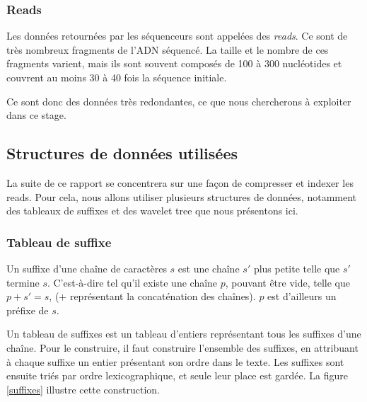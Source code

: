 \subsubsection{Reads}
Les données retournées par les séquenceurs sont appelées des \emph{reads}. Ce sont de très nombreux fragments de l'ADN séquencé. La taille et le nombre de ces fragments varient, mais ils sont souvent composés de 100 à 300 nucléotides et couvrent au moins 30 à 40 fois la séquence initiale. 

Ce sont donc des données très redondantes, ce que nous chercherons à exploiter dans ce stage.


\subsection{Structures de données utilisées}
La suite de ce rapport se concentrera sur une façon de compresser et indexer les reads. Pour cela, nous allons utiliser plusieurs structures de données, notamment des tableaux de suffixes et des wavelet tree que nous présentons ici.

\subsubsection{Tableau de suffixe}
Un suffixe d'une chaîne de caractères $s$ est une chaîne $s'$ plus petite telle que $s'$ termine $s$. C'est-à-dire tel qu'il existe une chaîne $p$, pouvant être vide, telle que $p + s' = s$, ($+$ représentant la concaténation des chaînes). $p$ est d'ailleurs un préfixe de $s$.

Un tableau de suffixes est un tableau d'entiers représentant tous les suffixes d'une chaîne. Pour le construire, il faut construire l'ensemble des suffixes, en attribuant à chaque suffixe un entier présentant son ordre dans le texte. Les suffixes sont ensuite triés par ordre lexicographique, et seule leur place est gardée. La figure \ref{suffixes} illustre cette construction.

